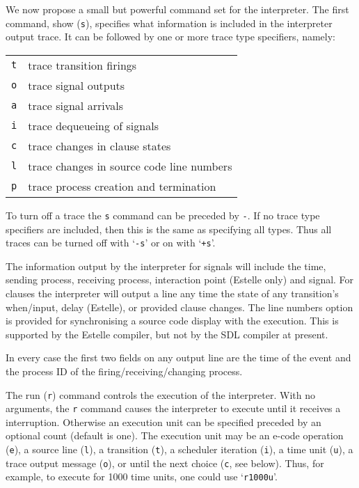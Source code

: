 We now propose a small but powerful command set for the interpreter.
The first command, show ({\tt s}), specifies what information is
included in the interpreter output trace. It can be followed
by one or more trace type specifiers, namely:

\begin{tabular}{ll}
{\tt t} & trace transition firings\\
{\tt o} & trace signal outputs\\
{\tt a} & trace signal arrivals\\
{\tt i} & trace dequeueing of signals\\
{\tt c} & trace changes in clause states\\
{\tt l} & trace changes in source code line numbers\\
{\tt p} & trace process creation and termination\\
\end{tabular}

To turn off a trace the {\tt s} command can be preceded by {\tt -}.
If no trace type specifiers are included, then this is the same
as specifying all types. Thus all traces can be turned off with 
`{\tt -s}' or on with `{\tt +s}'.

The information output by the interpreter for signals will include
the time, sending process, receiving process, interaction point
(Estelle only) and signal. 
For clauses the interpreter will output a line any time the state of
any transition's when/input, delay (Estelle), or provided clause changes.
The line numbers option is provided for synchronising a source code
display with the execution. This is supported by the Estelle
compiler, but not by the SDL compiler at present.

In every case the first two fields on any output line are the
time of the event and the process ID of the firing/receiving/changing
process.

The run ({\tt r}) command controls the execution of the 
interpreter. With no arguments, the {\tt r} command causes
the interpreter to execute until it receives a interruption.
Otherwise an execution unit can be specified preceded by an optional
count (default is one).
The execution unit may be an e-code
operation ({\tt e}), a source line ({\tt l}), 
a transition ({\tt t}), a scheduler iteration ({\tt i}),
a time unit ({\tt u}), a trace output message ({\tt o}),
or until the next choice ({\tt c}, see below).
Thus, for example, to execute for
1000 time units, one could use `{\tt r1000u}'.

